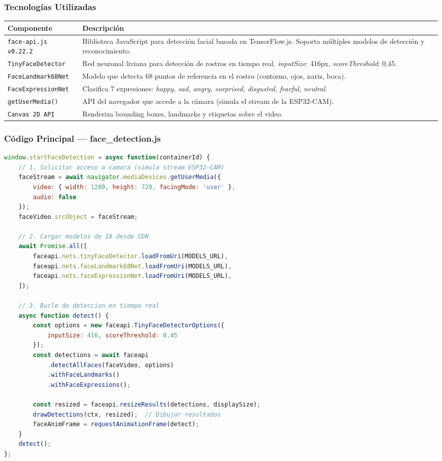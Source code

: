 \documentclass[12pt,a4paper]{article}
\begin{document}
\subsubsection{Tecnologías Utilizadas}

\begin{longtable}{p{4cm} p{9cm}}
  \toprule
  \textbf{Componente} & \textbf{Descripción} \\
  \midrule
  \endfirsthead
  \texttt{face-api.js v0.22.2} & Biblioteca JavaScript para detección facial basada en TensorFlow.js. Soporta múltiples modelos de detección y reconocimiento. \\[4pt]
  \texttt{TinyFaceDetector} & Red neuronal liviana para detección de rostros en tiempo real. \textit{inputSize}: 416px, \textit{scoreThreshold}: 0.45. \\[4pt]
  \texttt{FaceLandmark68Net} & Modelo que detecta 68 puntos de referencia en el rostro (contorno, ojos, nariz, boca). \\[4pt]
  \texttt{FaceExpressionNet} & Clasifica 7 expresiones: \textit{happy, sad, angry, surprised, disgusted, fearful, neutral}. \\[4pt]
  \texttt{getUserMedia()} & API del navegador que accede a la cámara (simula el stream de la ESP32-CAM). \\[4pt]
  \texttt{Canvas 2D API} & Renderiza bounding boxes, landmarks y etiquetas sobre el video. \\
  \bottomrule
\end{longtable}

\subsubsection{Código Principal — face\_detection.js}

\begin{lstlisting}[language=JavaScript, caption={Bucle principal de detección facial (face\_detection.js)}]
window.startFaceDetection = async function(containerId) {
    // 1. Solicitar acceso a camara (simula stream ESP32-CAM)
    faceStream = await navigator.mediaDevices.getUserMedia({
        video: { width: 1280, height: 720, facingMode: 'user' },
        audio: false
    });
    faceVideo.srcObject = faceStream;

    // 2. Cargar modelos de IA desde CDN
    await Promise.all([
        faceapi.nets.tinyFaceDetector.loadFromUri(MODELS_URL),
        faceapi.nets.faceLandmark68Net.loadFromUri(MODELS_URL),
        faceapi.nets.faceExpressionNet.loadFromUri(MODELS_URL),
    ]);

    // 3. Bucle de deteccion en tiempo real
    async function detect() {
        const options = new faceapi.TinyFaceDetectorOptions({
            inputSize: 416, scoreThreshold: 0.45
        });
        const detections = await faceapi
            .detectAllFaces(faceVideo, options)
            .withFaceLandmarks()
            .withFaceExpressions();

        const resized = faceapi.resizeResults(detections, displaySize);
        drawDetections(ctx, resized);  // Dibujar resultados
        faceAnimFrame = requestAnimationFrame(detect);
    }
    detect();
};
\end{lstlisting}
\end{document}
